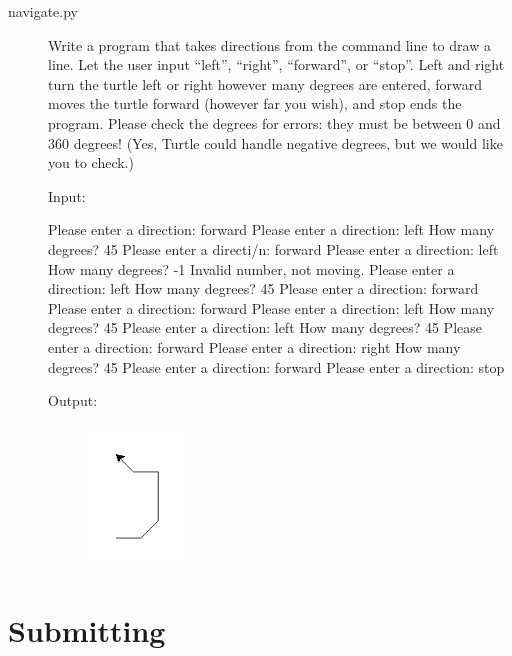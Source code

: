 \documentclass[11pt]{cselabheader}
\begin{document}
\begin{description}
  \item[navigate.py] Write a program that takes directions from the command line
    to draw a line. Let the user input ``left'', ``right'', ``forward'', or
    ``stop''. Left and right turn the turtle left or right however many degrees
    are entered, forward moves the turtle forward (however far you wish), and
    stop ends the program. Please check the degrees for errors: they must be
    between 0 and 360 degrees! (Yes, Turtle could handle negative degrees, but
    we would like you to check.)

    Input:

  \begin{verbatimcode}
Please enter a direction: forward
Please enter a direction: left
How many degrees? 45
Please enter a directi/n: forward
Please enter a direction: left
How many degrees? -1
Invalid number, not moving.
Please enter a direction: left
How many degrees? 45
Please enter a direction: forward
Please enter a direction: forward
Please enter a direction: left
How many degrees? 45
Please enter a direction: left
How many degrees? 45
Please enter a direction: forward
Please enter a direction: right
How many degrees? 45
Please enter a direction: forward
Please enter a direction: stop
  \end{verbatimcode}

    Output:
  \begin{figure}[!ht]
    \centering
    \includegraphics[width=1.0in]{img/navigate}
  \end{figure}


\end{description}

\pagebreak

\section{Submitting}
\end{document}
